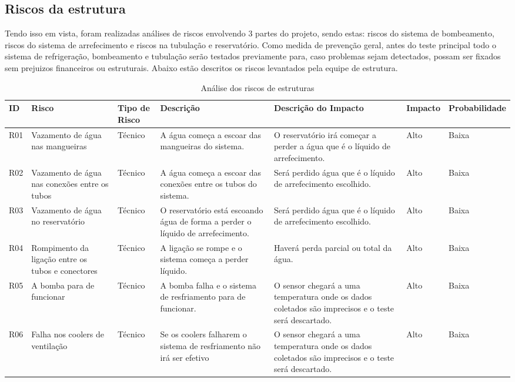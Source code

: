 \subsection{Riscos da estrutura}

Tendo  isso em vista, foram realizadas análises de riscos envolvendo 3 partes do projeto, sendo estas: riscos do sistema de bombeamento, riscos do sistema de arrefecimento e riscos na tubulação e reservatório.
Como medida de prevenção geral, antes do teste principal todo o sistema de refrigeração, bombeamento e tubulação serão testados previamente para, caso problemas sejam detectados, possam ser fixados sem prejuizos financeiros ou estruturais. Abaixo estão descritos os riscos levantados pela equipe de estrutura.

\begin{table}
    \centering
    \begin{tabular}{|p{1cm}|p{2.2cm}|p{1.8cm}|p{3cm}|p{3cm}|p{1.7cm}|p{2cm}|}
    \hline
    \textbf{ID}  & \textbf{Risco} & \textbf{Tipo de Risco} & \textbf{Descrição} & \textbf{Descrição do Impacto} & \textbf{Impacto} & \textbf{Probabilidade} \\ \hline
    R01 & Vazamento de água nas mangueiras & Técnico & A água começa a escoar das mangueiras do sistema. & O reservatório irá começar a perder a água que é o líquido de arrefecimento. & Alto & Baixa \\ \hline
    R02 & Vazamento de água nas conexões entre os tubos & Técnico & A água começa a escoar das conexões entre os tubos do sistema. & Será perdido água que é o líquido de arrefecimento escolhido. & Alto & Baixa \\ \hline
    R03 & Vazamento de água no reservatório & Técnico & O reservatório está escoando água de forma a perder o líquido de arrefecimento. & Será perdido água que é o líquido de arrefecimento escolhido. & Alto & Baixa \\ \hline
    R04 & Rompimento da ligação entre os tubos e conectores & Técnico & A ligação se rompe e o sistema começa a perder líquido. &Haverá perda parcial ou total da água.  & Alto & Baixa \\ \hline
    R05 & A bomba para de funcionar & Técnico & A bomba falha e o sistema de resfriamento para de funcionar. &O sensor chegará a uma temperatura onde os dados coletados são imprecisos e o teste será descartado.  & Alto & Baixa \\ \hline
    R06 & Falha nos coolers de ventilação & Técnico & Se os coolers falharem o sistema de resfriamento não irá ser efetivo  & O sensor chegará a uma temperatura onde os dados coletados são imprecisos e o teste será descartado.  & Alto & Baixa \\ \hline    
\end{tabular}
    \caption{Análise dos riscos de estruturas}
    \end{table} 


